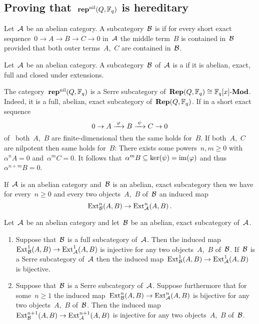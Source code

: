 \documentclass[a4paper,11pt]{scrartcl}
\begin{document}
\subsection{Proving that~$\mathbf{rep}^{\mathrm{nil}}(Q, \mathbb{F}_q)$ is hereditary}
\label{proof of repnil is hereditary}

\begin{definition}
  Let~$\mathcal{A}$ be an abelian category.
  A subcategory~$\mathcal{B}$ is  if for every short exact sequence~$0 \to A \to B \to C \to 0$ in~$\mathcal{A}$ the middle term~$B$ is contained in~$\mathcal{B}$ provided that both outer terms~$A$,~$C$ are contained in~$\mathcal{B}$.
\end{definition}

\begin{definition}
  Let~$\mathcal{A}$ be an abelian category.
  A subcategory~$\mathcal{B}$ of~$\mathcal{A}$ is a  if it is abelian, exact, full and closed under extensions.
\end{definition}

\begin{example}
  \label{repnil is a serre subcategory}
  The category~$\mathbf{rep}^{\mathrm{nil}}(Q, \mathbb{F}_q)$ is a Serre subcategory of~$\mathbf{Rep}(Q, \mathbb{F}_q) \cong \mathbb{F}_q[x]\textrm{-}\mathbf{Mod}$.
  Indeed, it is a full, abelian, exact subcategory of~$\mathbf{Rep}(Q, \mathbb{F}_q)$.
  If in a short exact sequence
  \[
    0
    \to
    A
    \xrightarrow{\; \varphi \;}
    B
    \xrightarrow{\; \psi \;}
    C
    \to
    0
  \]
  of~ both~$A$,~$B$ are finite-dimensional then the same holds for~$B$.
  If both~$A$,~$C$ are nilpotent then same holds for~$B$:
  There exists some powers~$n, m \geq 0$ with~$\alpha^n A = 0$ and~$\alpha^m C = 0$.
  It follows that~$\alpha^m B \subseteq \ker(\psi) = \operatorname{im}(\varphi)$ and thus~$\alpha^{n+m} B = 0$.
\end{example}

If~$\mathcal{A}$ is an abelian category and~$\mathcal{B}$ is an abelian, exact subcategory then we have for every~$n \geq 0$ and every two objects~$A$,~$B$ of~$\mathcal{B}$ an induced map
\[
  \operatorname{Ext}^n_{\mathcal{B}}(A,B)
  \to
  \operatorname{Ext}^n_{\mathcal{A}}(A,B) \,.
\]

\begin{proposition}
  \label{ext for serre subcategories}
  Let~$\mathcal{A}$ be an abelian category and let~$\mathcal{B}$ be an abelian, exact subcategory of~$\mathcal{A}$.
  \begin{enumerate}
    \item
      Suppose that~$\mathcal{B}$ is a full subcategory of~$\mathcal{A}$.
      Then the induced map~$\operatorname{Ext}^1_{\mathcal{B}}(A,B) \to \operatorname{Ext}^1_{\mathcal{A}}(A,B)$ is injective for any two objects~$A$,~$B$ of~$\mathcal{B}$.
      If~$\mathcal{B}$ is a Serre subcategory of~$\mathcal{A}$ then the induced map~$\operatorname{Ext}^1_{\mathcal{B}}(A,B) \to \operatorname{Ext}^1_{\mathcal{A}}(A,B)$ is bijective.
    \item
      Suppose that~$\mathcal{B}$ is a Serre subcategory of~$\mathcal{A}$.
      Suppose furthermore that for some~$n \geq 1$ the induced map~$\operatorname{Ext}^n_{\mathcal{B}}(A,B) \to \operatorname{Ext}^n_{\mathcal{A}}(A,B)$ is bijective for any two objects~$A$,~$B$ of~$\mathcal{B}$.
      Then the induced map~$\operatorname{Ext}^{n+1}_{\mathcal{B}}(A,B) \to \operatorname{Ext}^{n+1}_{\mathcal{A}}(A,B)$ is injective for any two objects~$A$,~$B$ of~$\mathcal{B}$. 
  \end{enumerate}
\end{proposition}
\end{document}
